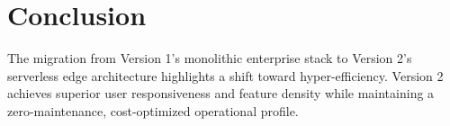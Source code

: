 \documentclass[12pt,a4paper]{article}
\begin{document}
\section{Conclusion}
The migration from Version 1's monolithic enterprise stack to Version 2's serverless edge architecture highlights a shift toward hyper-efficiency. Version 2 achieves superior user responsiveness and feature density while maintaining a zero-maintenance, cost-optimized operational profile.
\end{document}
